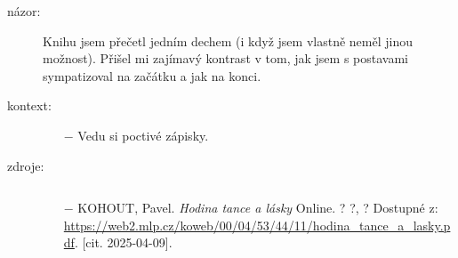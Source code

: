 \documentclass{article}
\begin{document}
\begin{description}
    \item[názor:] Knihu jsem přečetl jedním dechem (i když jsem vlastně neměl jinou možnost). Přišel mi zajímavý kontrast v tom, jak jsem s postavami sympatizoval na začátku a jak na konci.
    \item[kontext:]  \vspace{-0.5em}
        \setlength\itemsep{0em}
        \begin{itemize}
            \item[$-$] Vedu si poctivé zápisky.
        \end{itemize}
    \item[zdroje:] $ $
    \begin{itemize}
        \setlength\itemsep{0em}
        \item[$-$] KOHOUT, Pavel. \textit{Hodina tance a lásky} Online. ? ?, ? Dostupné z: \url{https://web2.mlp.cz/koweb/00/04/53/44/11/hodina_tance_a_lasky.pdf}. [cit. 2025-04-09].
    \end{itemize}
\end{description}
\end{document}

